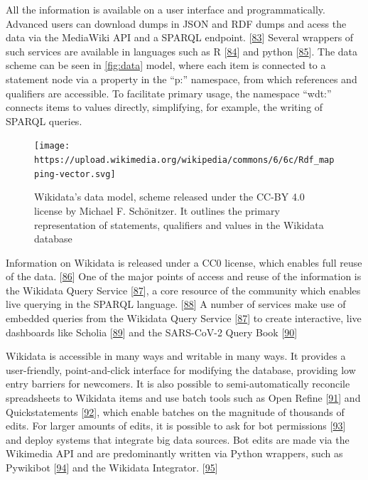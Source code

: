 All the information is available on a user interface and programmatically.
Advanced users can download dumps in JSON and RDF dumps and acess the data via the MediaWiki API and a SPARQL endpoint. {[}\protect\hyperlink{ref-4wSLyAPr}{83}{]}
Several wrappers of such services are available in languages such as R {[}\protect\hyperlink{ref-1HghnypzG}{84}{]} and python {[}\protect\hyperlink{ref-VKWfrtR1}{85}{]}.
The data scheme can be seen in \ref{fig:data} model, where each item is connected to a statement node via a property in the ``p:'' namespace, from which references and qualifiers are accessible.
To facilitate primary usage, the namespace ``wdt:'' connects items to values directly, simplifying, for example, the writing of SPARQL queries.

\begin{figure}
\hypertarget{fig:datamodel}{%
\centering
\texttt{[image: https://upload.wikimedia.org/wikipedia/commons/6/6c/Rdf\_mapping-vector.svg]}
\caption{Wikidata's data model, scheme released under the CC-BY 4.0 license by Michael F. Schönitzer. It outlines the primary representation of statements, qualifiers and values in the Wikidata database}\label{fig:datamodel}
}
\end{figure}

Information on Wikidata is released under a CC0 license, which enables full reuse of the data. {[}\protect\hyperlink{ref-tQIJPG4k}{86}{]}
One of the major points of access and reuse of the information is the Wikidata Query Service {[}\protect\hyperlink{ref-2wDsXBwd}{87}{]}, a core resource of the community which enables live querying in the SPARQL language. {[}\protect\hyperlink{ref-dsmUPCk}{88}{]}
A number of services make use of embedded queries from the Wikidata Query Service {[}\protect\hyperlink{ref-2wDsXBwd}{87}{]} to create interactive, live dashboards like Scholia {[}\protect\hyperlink{ref-17P4zruFZ}{89}{]} and the SARS-CoV-2 Query Book {[}\protect\hyperlink{ref-guMp3q1V}{90}{]}

Wikidata is accessible in many ways and writable in many ways.
It provides a user-friendly, point-and-click interface for modifying the database, providing low entry barriers for newcomers.
It is also possible to semi-automatically reconcile spreadsheets to Wikidata items and use batch tools such as Open Refine {[}\protect\hyperlink{ref-17rRjL1Xj}{91}{]} and Quickstatements {[}\protect\hyperlink{ref-K6ggpwRg}{92}{]}, which enable batches on the magnitude of thousands of edits.
For larger amounts of edits, it is possible to ask for bot permissions {[}\protect\hyperlink{ref-sSH04fxa}{93}{]} and deploy systems that integrate big data sources.
Bot edits are made via the Wikimedia API and are predominantly written via Python wrappers, such as Pywikibot {[}\protect\hyperlink{ref-5K5MfnVl}{94}{]} and the Wikidata Integrator. {[}\protect\hyperlink{ref-qDI8I4IJ}{95}{]}

